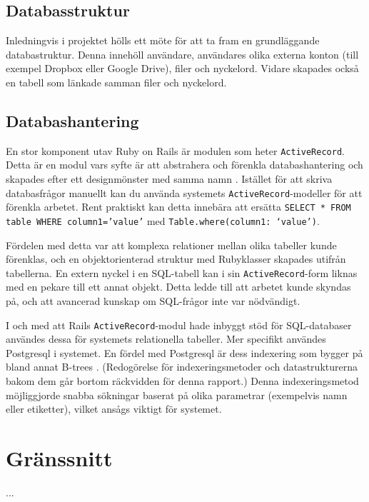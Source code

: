 \subsection{Databasstruktur}
\label{ssec:activerec}

Inledningvis i projektet hölls ett möte för att ta fram en grundläggande databastruktur. Denna innehöll användare, användares olika externa konton (till exempel Dropbox eller Google Drive), filer och nyckelord. Vidare skapades också en tabell som länkade samman filer och nyckelord.

\subsection{Databashantering}

En stor komponent utav Ruby on Rails är modulen som heter \texttt{ActiveRecord}. Detta är en modul vars syfte är att abstrahera och förenkla databashantering \cite{objrel} och skapades efter ett designmönster med samma namn \cite[kapitel 1]{proar}. Istället för att skriva databasfrågor manuellt kan du använda systemets \texttt{ActiveRecord}-modeller för att förenkla arbetet. Rent praktiskt kan detta innebära att ersätta \texttt{SELECT * FROM table WHERE column1=’value’} med \texttt{Table.where(column1: ‘value’)}.

Fördelen med detta var att komplexa relationer mellan olika tabeller kunde förenklas, och en objektorienterad struktur med Rubyklasser skapades utifrån tabellerna. En extern nyckel i en SQL-tabell kan i sin \texttt{ActiveRecord}-form liknas med en pekare till ett annat objekt. Detta ledde till att arbetet kunde skyndas på, och att avancerad kunskap om SQL-frågor inte var nödvändigt.

I och med att Rails \texttt{ActiveRecord}-modul hade inbyggt stöd för SQL-databaser användes dessa för systemets relationella tabeller. Mer specifikt användes Postgresql i systemet. En fördel med Postgresql är dess indexering som bygger på bland annat B-trees \cite{indexes}. (Redogörelse för indexeringsmetoder och datastrukturerna bakom dem går bortom räckvidden för denna rapport.) Denna indexeringsmetod möjliggjorde snabba sökningar baserat på olika parametrar (exempelvis namn eller etiketter), vilket ansågs viktigt för systemet.

\section{Gränssnitt}

...

